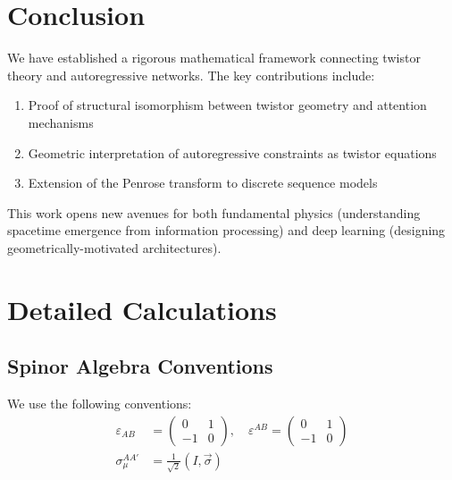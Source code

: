 \documentclass[12pt,a4paper]{article}
\theoremstyle{definition}
\begin{document}
\section{Conclusion}

We have established a rigorous mathematical framework connecting twistor theory and autoregressive networks. The key contributions include:

\begin{enumerate}
\item Proof of structural isomorphism between twistor geometry and attention mechanisms
\item Geometric interpretation of autoregressive constraints as twistor equations
\item Extension of the Penrose transform to discrete sequence models
\end{enumerate}

This work opens new avenues for both fundamental physics (understanding spacetime emergence from information processing) and deep learning (designing geometrically-motivated architectures).

\appendix
\section{Detailed Calculations}

\subsection{Spinor Algebra Conventions}

We use the following conventions:
\begin{align}
\varepsilon_{AB} &= \begin{pmatrix} 0 & 1 \\ -1 & 0 \end{pmatrix}, \quad \varepsilon^{AB} = \begin{pmatrix} 0 & 1 \\ -1 & 0 \end{pmatrix} \\
\sigma_\mu^{AA'} &= \frac{1}{\sqrt{2}}(I, \vec{\sigma})
\end{align}
\end{document}
